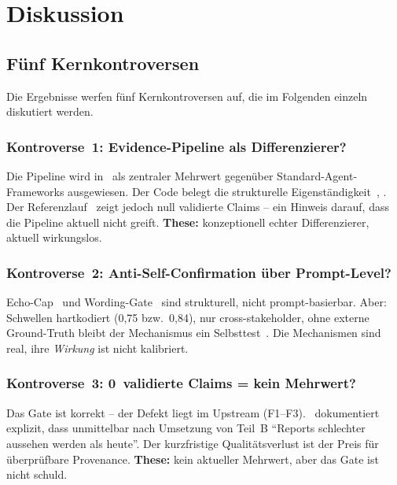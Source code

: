 
\chapter{Diskussion}\label{ch:diskussion}

\section{Fünf Kernkontroversen}\label{sec:kontroversen}

Die Ergebnisse werfen fünf Kernkontroversen auf, die im Folgenden einzeln diskutiert werden.

\subsection{Kontroverse~1: Evidence-Pipeline als Differenzierer?}\label{sec:k1}

Die Pipeline wird in~\cite{adr-0011} als zentraler Mehrwert gegen{\"u}ber Standard-Agent-Frameworks ausgewiesen. Der Code belegt die strukturelle Eigenst{\"a}ndigkeit~, . Der Referenzlauf~\cite{audit-r2} zeigt jedoch null validierte Claims -- ein Hinweis darauf, dass die Pipeline aktuell nicht greift. \textbf{These:} konzeptionell echter Differenzierer, aktuell wirkungslos.

\subsection{Kontroverse~2: Anti-Self-Confirmation {\"u}ber Prompt-Level?}\label{sec:k2}

Echo-Cap~ und Wording-Gate~ sind strukturell, nicht prompt-basierbar. Aber: Schwellen hartkodiert (0{,}75 bzw.\ 0{,}84), nur cross-stakeholder, ohne externe Ground-Truth bleibt der Mechanismus ein Selbsttest~\cite{analyticflexibility,uas2025}. Die Mechanismen sind real, ihre \emph{Wirkung} ist nicht kalibriert.

\subsection{Kontroverse~3: 0~validierte Claims = kein Mehrwert?}\label{sec:k3}

Das Gate ist korrekt -- der Defekt liegt im Upstream (F1--F3).~\cite{adr-0013} dokumentiert explizit, dass unmittelbar nach Umsetzung von Teil~B \enquote{Reports schlechter aussehen werden als heute}. Der kurzfristige Qualit{\"a}tsverlust ist der Preis f{\"u}r {\"u}berpr{\"u}fbare Provenance. \textbf{These:} kein aktueller Mehrwert, aber das Gate ist nicht schuld.

